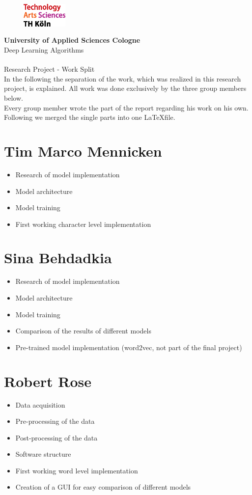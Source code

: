 \documentclass[a4paper,11pt,oneside]{article}
\begin{document}
  \pagestyle{fancy} %
  \fancyhead{}
  \fancyhf{}
  \renewcommand{\headrulewidth}{0pt}
  \renewcommand{\footrulewidth}{0.4pt}
  \fancyfoot[R] {}
  \begin{figure}
    \includegraphics[width=0.2\textwidth]{sources/logo_TH-Koeln_CMYK_22pt}
  \end{figure}
  \Large
  \textbf{University of Applied Sciences Cologne}\\
  Deep Learning Algorithms\\
  \\
  \large
  Research Project - Work Split\\

In the following the separation of the work, which was realized in this research project, is explained. All work was done exclusively by the three group members below.\\
Every group member wrote the part of the report regarding his work on his own. Following we merged the single parts into one \LaTeX file.

\section*{Tim Marco Mennicken}

\begin{itemize}
\item Research of model implementation
\item Model architecture
\item Model training
\item First working character level implementation
\end{itemize}

\section*{Sina Behdadkia}

\begin{itemize}
\item Research of model implementation
\item Model architecture
\item Model training
\item Comparison of the results of different models
\item Pre-trained model implementation (word2vec, not part of the final project)
\end{itemize}

\section*{Robert Rose}

\begin{itemize}
\item Data acquisition
\item Pre-processing of the data
\item Post-processing of the data
\item Software structure
\item First working word level implementation
\item Creation of a GUI for easy comparison of different models
\end{itemize}
  
\end{document}

